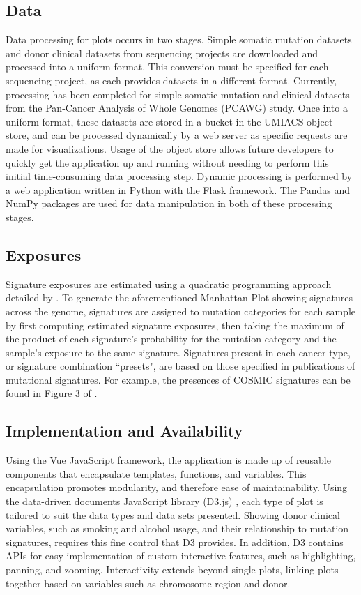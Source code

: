 \documentclass[12pt, letterpaper]{article}
\begin{document}
\subsection{Data}
Data processing for plots occurs in two stages. 
Simple somatic mutation datasets and donor clinical datasets from sequencing projects are downloaded and processed into a uniform format. 
This conversion must be specified for each sequencing project, as each provides datasets in a different format.
Currently, processing has been completed for simple somatic mutation and clinical datasets from the Pan-Cancer Analysis of Whole Genomes (PCAWG) study.
Once into a uniform format, these datasets are stored in a bucket in the UMIACS object store, and can be processed dynamically by a web server as specific requests are made for visualizations.
Usage of the object store allows future developers to quickly get the application up and running without needing to perform this initial time-consuming data processing step.
Dynamic processing is performed by a web application written in Python with the Flask framework. 
The Pandas and NumPy packages are used for data manipulation in both of these processing stages.

\subsection{Exposures}
Signature exposures are estimated using a quadratic programming approach detailed by \citet{huang2017detecting}.
To generate the aforementioned Manhattan Plot showing signatures across the genome, signatures are assigned to mutation categories for each sample by first computing estimated signature exposures, then taking the maximum of the product of each signature's probability for the mutation category and the sample's exposure to the same signature.
Signatures present in each cancer type, or signature combination ``presets", are based on those specified in publications of mutational signatures.
For example, the presences of COSMIC signatures can be found in Figure 3 of \citet{alexandrov2013signatures}.

\subsection{Implementation and Availability}
Using the Vue JavaScript framework, the application is made up of reusable components that encapsulate templates, functions, and variables.
This encapsulation promotes modularity, and therefore ease of maintainability.
Using the data-driven documents JavaScript library (D3.js) \citep{bostock2011d3}, each type of plot is tailored to suit the data types and data sets presented.
Showing donor clinical variables, such as smoking and alcohol usage, and their relationship to mutation signatures, requires this fine control that D3 provides.
In addition, D3 contains APIs for easy implementation of custom interactive features, such as highlighting, panning, and zooming.
Interactivity extends beyond single plots, linking plots together based on variables such as chromosome region and donor.
\end{document}
